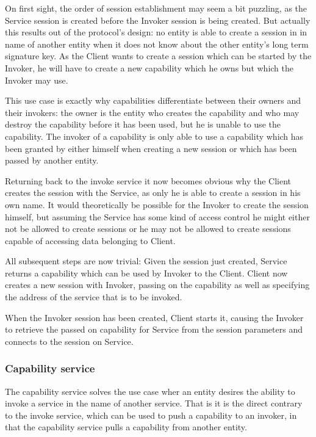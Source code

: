 On first sight, the order of session establishment may seem a bit puzzling, as the Service session is created before the Invoker session is being created.
But actually this results out of the protocol's design: no entity is able to create a session in in name of another entity when it does not know about the other entity's long term signature key.
As the Client wants to create a session which can be started by the Invoker, he will have to create a new capability which he owns but which the Invoker may use.

This use case is exactly why capabilities differentiate between their owners and their invokers:
the owner is the entity who creates the capability and who may destroy the capability before it has been used, but he is unable to use the capability.
The invoker of a capability is only able to use a capability which has been granted by either himself when creating a new session or which has been passed by another entity.

Returning back to the invoke service it now becomes obvious why the Client creates the session with the Service, as only he is able to create a session in his own name.
It would theoretically be possible for the Invoker to create the session himself, but assuming the Service has some kind of access control he might either not be allowed to create sessions or he may not be allowed to create sessions capable of accessing data belonging to Client.

All subsequent steps are now trivial:
Given the session just created, Service returns a capability which can be used by Invoker to the Client.
Client now creates a new session with Invoker, passing on the capability as well as specifying the address of the service that is to be invoked.

When the Invoker session has been created, Client starts it, causing the Invoker to retrieve the passed on capability for Service from the session parameters and connects to the session on Service.

\subsubsection{Capability service}
\label{sec:capability-service}

The capability service solves the use case wher an entity desires the ability to invoke a service in the name of another service.
That is it is the direct contrary to the invoke service, which can be used to push a capability to an invoker, in that the capability service pulls a capability from another entity.

